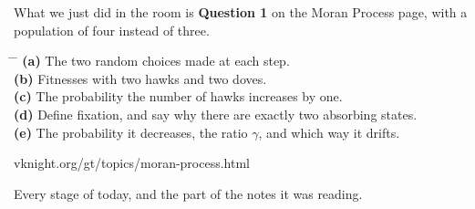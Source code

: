{\large What we just did in the room is \textbf{Question 1} on the Moran
Process page, with a population of four instead of three.}

\vspace{0.9cm}

\hspace{0.6cm}
\begin{minipage}{0.92\linewidth}
{\large
\begin{tabbing}
\hspace{1.2cm} \= \hspace{17cm} \= \kill
\textbf{(a)} \> The two random choices made at each step. \> [3]\\[0.55em]
\textbf{(b)} \> Fitnesses with two hawks and two doves. \> [6]\\[0.55em]
\textbf{(c)} \> The probability the number of hawks increases by one. \> [7]\\[0.55em]
\textbf{(d)} \> Define fixation, and say why there are exactly two absorbing
  states. \> [5]\\[0.55em]
\textbf{(e)} \> The probability it decreases, the ratio \(\gamma\), and which
  way it drifts. \> [4]
\end{tabbing}}
\end{minipage}

\vspace{1.2cm}

\begin{center}
{\large\color{inkgrey} vknight.org/gt/topics/moran-process.html}
\end{center}

\newpage
\nonotes
{}

\vspace{0.3cm}

{\large Every stage of today, and the part of the notes it was reading.}

\vspace{0.35cm}

